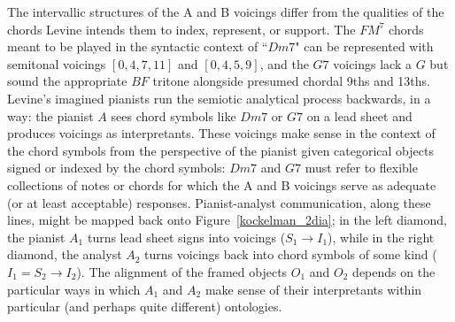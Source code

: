 The intervallic structures of the A and B voicings differ from the qualities of the chords Levine intends them to index, represent, or support.  The $FM^7$ chords meant to be played in the syntactic context of ``$Dm7$" can be represented with semitonal voicings $[0,4,7,11]$ and $[0,4,5,9]$, and the $G7$ voicings lack a $G$ but sound the appropriate $BF$ tritone alongside presumed chordal 9ths and 13ths.  Levine's imagined pianists run the semiotic analytical process backwards, in a way: the pianist $A$ sees chord symbols like $Dm7$ or $G7$ on a lead sheet and produces voicings as interpretants.  These voicings make sense in the context of the chord symbols from the perspective of the pianist given categorical objects signed or indexed by the chord symbols: $Dm7$ and $G7$ must refer to flexible collections of notes or chords for which the A and B voicings serve as adequate (or at least acceptable) responses.  Pianist-analyst communication, along these lines, might be mapped back onto Figure~\ref{kockelman_2dia}; in the left diamond, the pianist $A_1$ turns lead sheet signs into voicings ($S_1 \rightarrow I_1$), while in the right diamond, the analyst $A_2$ turns voicings back into chord symbols of some kind ($I_1 = S_2 \rightarrow I_2$).  The alignment of the framed objects $O_1$ and $O_2$ depends on the particular ways in which $A_1$ and $A_2$ make sense of their interpretants within particular (and perhaps quite different) ontologies.

